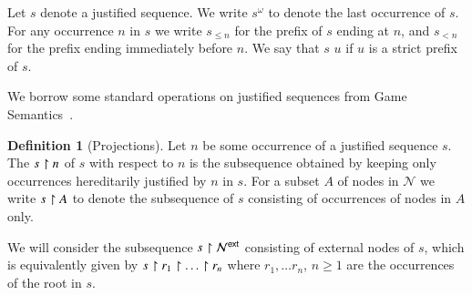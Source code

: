 \documentclass{elsarticle}
\theoremstyle{plain}
\theoremstyle{definition}
\newtheorem{definition}{Definition}[section]
\theoremstyle{remark}
\newcommand\Nodes{\mathcal{N}}%
\newcommand{\ExtNodes}{\Nodes^{\sf ext}}
\begin{document}
Let $s$ denote a justified sequence.
We write $s^\omega$ to denote the last occurrence of $s$. For any occurrence $n$ in $s$ we write $s_{\leq n}$ for the prefix of $s$ ending at $n$, and $s_{<n}$ for the prefix ending immediately before $n$.
We say that $s$  $u$ if $u$ is a strict prefix of $s$.

We borrow some standard operations on justified sequences from Game Semantics~\cite{Abr02}.
\begin{definition}[Projections]
Let $n$ be some occurrence of a justified sequence $s$. The  $s\upharpoonright n$ of $s$ with respect to $n$ is the subsequence obtained by keeping only occurrences hereditarily justified by $n$ in $s$. For a subset $A$ of nodes in $\Nodes$ we write $s \upharpoonright A$ to denote the subsequence of $s$ consisting of occurrences of nodes in $A$ only.

We will consider the subsequence $s\filter\ExtNodes$ consisting of external nodes of $s$, which is equivalently given by $s\upharpoonright r_1 \upharpoonright \ldots \upharpoonright r_n$ where $r_1, \ldots r_n$, $n\geq 1$ are the occurrences of the root in $s$.
\end{definition}
\end{document}
